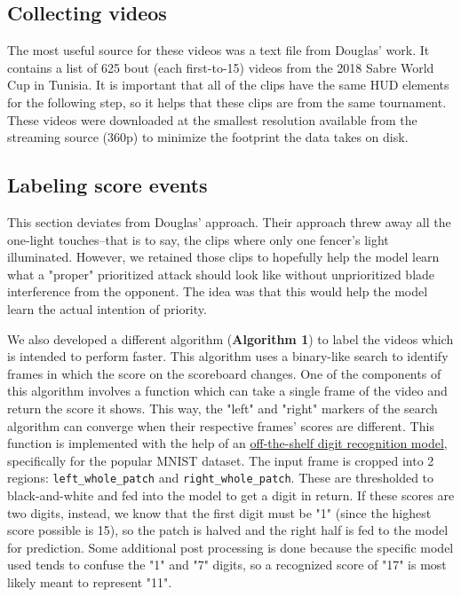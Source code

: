 \documentclass[10pt,twocolumn,letterpaper]{article}
\begin{document}
\subsection{Collecting videos}

The most useful source for these videos was a text file from Douglas' work.
It contains a list of 625 bout (each first-to-15) videos from the 2018 Sabre World Cup in Tunisia.
It is important that all of the clips have the same HUD elements for the following step, so it helps that these clips are from the same tournament.
These videos were downloaded at the smallest resolution available from the streaming source (360p) to minimize the footprint the data takes on disk.

\subsection{Labeling score events}

This section deviates from Douglas' approach.
Their approach threw away all the one-light touches--that is to say, the clips where only one fencer's light illuminated.
However, we retained those clips to hopefully help the model learn what a "proper" prioritized attack should look like without unprioritized blade interference from the opponent.
The idea was that this would help the model learn the actual intention of priority.

We also developed a different algorithm (\textbf{Algorithm 1}) to label the videos which is intended to perform faster.
This algorithm uses a binary-like search to identify frames in which the score on the scoreboard changes.
One of the components of this algorithm involves a function which can take a single frame of the video and return the score it shows.
This way, the "left" and "right" markers of the search algorithm can converge when their respective frames' scores are different.
This function is implemented with the help of an \href{https://huggingface.co/prithivMLmods/Mnist-Digits-SigLIP2}{off-the-shelf digit recognition model}, specifically for the popular MNIST dataset.
The input frame is cropped into 2 regions: \verb+left_whole_patch+ and \verb+right_whole_patch+.
These are thresholded to black-and-white and fed into the model to get a digit in return.
If these scores are two digits, instead, we know that the first digit must be "1" (since the highest score possible is 15), so the patch is halved and the right half is fed to the model for prediction.
Some additional post processing is done because the specific model used tends to confuse the "1" and "7" digits, so a recognized score of "17" is most likely meant to represent "11".
\end{document}
